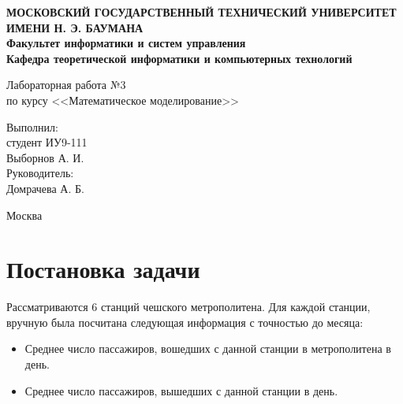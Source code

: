 \documentclass[12pt,a4paper,oneside]{extarticle}
\begin{document}
\pgfplotsset{compat=1.8}

\thispagestyle{empty}
\newpage
{
\centering


\textbf{
МОСКОВСКИЙ ГОСУДАРСТВЕННЫЙ ТЕХНИЧЕСКИЙ УНИВЕРСИТЕТ ИМЕНИ Н. Э. БАУМАНА \\
Факультет информатики и систем управления \\
Кафедра теоретической информатики и компьютерных технологий}
\bigskip
\bigskip
\bigskip
\bigskip
\bigskip
\bigskip
\bigskip

\vfill


Лабораторная работа №3 \\
по курсу <<Математическое моделирование>>

\bigskip

\bigskip

\vfill



\hfill\parbox{4cm} {
Выполнил:\\
студент ИУ9-111 \hfill \\
Выборнов А. И.\hfill \medskip\\
Руководитель:\\
Домрачева А. Б.\hfill
}


\vspace{\fill}

Москва \number\year
\clearpage
}



\clearpage


\section{Постановка задачи}
    Рассматриваются 6 станций чешского метрополитена. Для каждой станции, вручную была посчитана следующая информация с точностью до месяца:
    \begin{itemize}
        \item Среднее число пассажиров, вошедших с данной станции в метрополитена в день.
        \item Среднее число пассажиров, вышедших с данной станции в день.
    \end{itemize}
\end{document}
